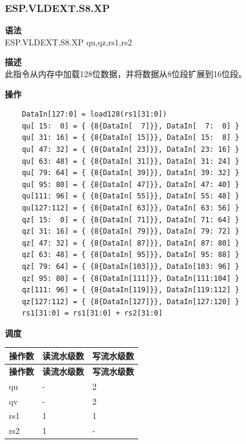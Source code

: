 \newpage
\subsubsection{ESP.VLDEXT.S8.XP}\label{instruction:ESPVLDEXTS8XP}
\textbf{语法}\\
ESP.VLDEXT.S8.XP qu,qz,rs1,rs2

\textbf{描述}\\
此指令从内存中加载128位数据，并将数据从8位段扩展到16位段。

\textbf{操作}\\

\begin{lstlisting}
    DataIn[127:0] = load128(rs1[31:0])
    qu[ 15:  0] = { {8{DataIn[  7]}}, DataIn[  7:  0] }
    qu[ 31: 16] = { {8{DataIn[ 15]}}, DataIn[ 15:  8] }
    qu[ 47: 32] = { {8{DataIn[ 23]}}, DataIn[ 23: 16] }
    qu[ 63: 48] = { {8{DataIn[ 31]}}, DataIn[ 31: 24] }
    qu[ 79: 64] = { {8{DataIn[ 39]}}, DataIn[ 39: 32] }
    qu[ 95: 80] = { {8{DataIn[ 47]}}, DataIn[ 47: 40] }
    qu[111: 96] = { {8{DataIn[ 55]}}, DataIn[ 55: 48] }
    qu[127:112] = { {8{DataIn[ 63]}}, DataIn[ 63: 56] }
    qz[ 15:  0] = { {8{DataIn[ 71]}}, DataIn[ 71: 64] }
    qz[ 31: 16] = { {8{DataIn[ 79]}}, DataIn[ 79: 72] }
    qz[ 47: 32] = { {8{DataIn[ 87]}}, DataIn[ 87: 80] }
    qz[ 63: 48] = { {8{DataIn[ 95]}}, DataIn[ 95: 88] }
    qz[ 79: 64] = { {8{DataIn[103]}}, DataIn[103: 96] }
    qz[ 95: 80] = { {8{DataIn[111]}}, DataIn[111:104] }
    qz[111: 96] = { {8{DataIn[119]}}, DataIn[119:112] }
    qz[127:112] = { {8{DataIn[127]}}, DataIn[127:120] }
    rs1[31:0] = rs1[31:0] + rs2[31:0]
\end{lstlisting}

\textbf{调度}\\
\begin{longtable}[c]{|l|l|l|}
    \hline
    \rowcolor{lightgray}
    \textbf{操作数} & \textbf{读流水级数} & \textbf{写流水级数} \\\hline
    \endfirsthead
    \hline
    \rowcolor{lightgray}
     \textbf{操作数} & \textbf{读流水级数} & \textbf{写流水级数} \\\hline
    \endhead
    \hline
    \endfoot

  qu & - & 2 \\\hline
  qv & - & 2 \\\hline
  rs1 & 1 & 1 \\\hline
    rs2 & 1 & -

\end{longtable}

